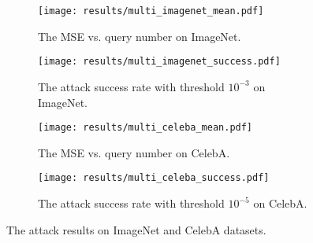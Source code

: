 \begin{figure*}[htpb]
\begin{subfigure}[t]{0.2465\linewidth}
    \centering
    \texttt{[image: results/multi\_imagenet\_mean.pdf]}
    \caption{The MSE vs. query number on ImageNet.}
    \label{fig:result-imagenet}
\end{subfigure}
\hspace{1mm}
\begin{subfigure}[t]{0.231\linewidth}
    \centering
    \texttt{[image: results/multi\_imagenet\_success.pdf]}
    \caption{The attack success rate with threshold $10^{-3}$ on ImageNet.}
    \label{fig:result-imagenet-sr}
\end{subfigure}
\hspace{1mm}
\begin{subfigure}[t]{0.2465\linewidth}
    \centering
    \texttt{[image: results/multi\_celeba\_mean.pdf]}
    \caption{The MSE vs. query number on CelebA.}
    \label{fig:result-celeba}
\end{subfigure}
\hspace{1mm}
\begin{subfigure}[t]{0.235\linewidth}
    \centering
    \texttt{[image: results/multi\_celeba\_success.pdf]}
    \caption{The attack success rate with threshold $10^{-5}$ on CelebA.}
    \label{fig:result-celeba-sr}
\end{subfigure}
\caption{The attack results on ImageNet and CelebA datasets.}
\label{fig:results}
\end{figure*}

